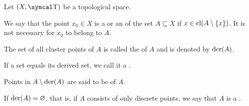 \begin{definition}\label{def:topological_derived_set}\cite[24]{Engelking1989}
  Let \( (X, \CT) \) be a topological space.

  \begin{defenum}
     We say that the point \( x_0 \in X \) is a  or an  of the set \( A \subseteq X \) if \( x \in \operatorname{cl}(A \setminus \{ x \}) \). It is not necessary for \( x_0 \) to belong to \( A \).

     The set of all cluster points of \( A \) is called the  of \( A \) and is denoted by \( \operatorname{der}(A) \).

     If a set equals its derived set, we call it a .

     Points in \( A \setminus \operatorname{der}(A) \) are said to be  of \( A \).

     If \( \operatorname{der}(A) = \varnothing \), that is, if \( A \) consists of only discrete points, we say that \( A \) is a .
  \end{defenum}
\end{definition}

